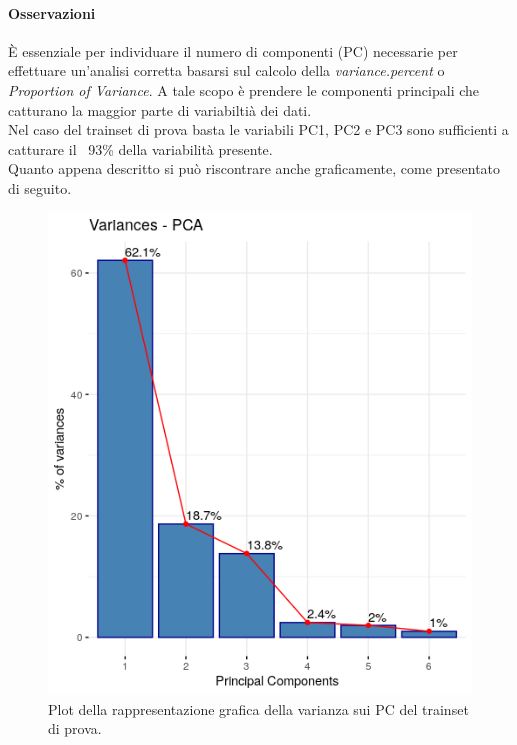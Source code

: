 \paragraph{Osservazioni}
\`E essenziale per individuare il numero di componenti (PC) necessarie per effettuare un'analisi corretta basarsi sul calcolo della \textit{variance.percent} o \textit{Proportion of Variance}. A tale scopo \`e prendere le componenti principali che catturano la maggior parte di variabilti\`a dei dati.\\
Nel caso del trainset di prova basta le variabili PC1, PC2 e PC3 sono sufficienti a catturare il ~93\% della variabilit\`a presente.\\
Quanto appena descritto si pu\`o riscontrare anche graficamente, come presentato di seguito.

\begin{figure}[H]
\centering
	\includegraphics[width=0.60\linewidth]{../../PCA/plot/variances_rete-prova.png}
	\caption{Plot della rappresentazione grafica della varianza sui PC del trainset di prova.}
	\label{Plot della rappresentazione grafica della varianza sui PC del trainset di prova.}
\end{figure}

